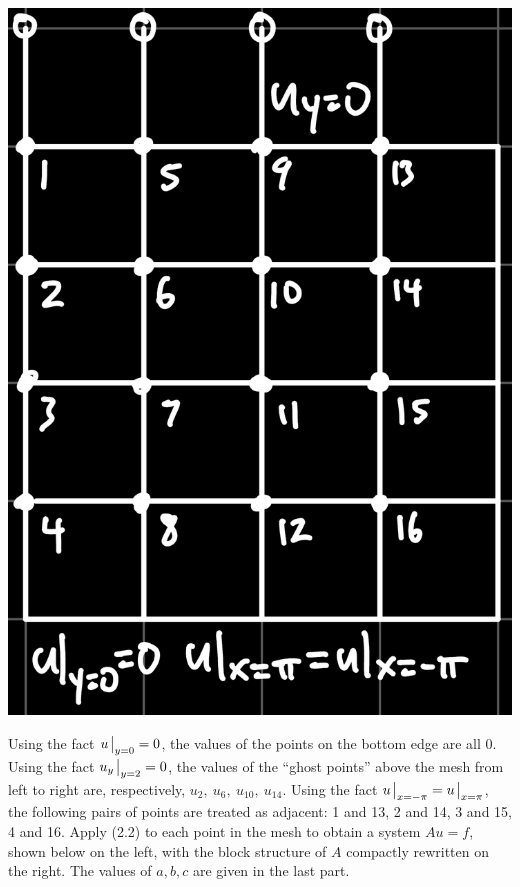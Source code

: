 \documentclass{article}
\begin{document}
\begin{enumerate}
\begin{enumerate}
	\begin{center}
		\includegraphics[scale=.1]{hw6 2 grid}
	\end{center}
	
	Using the fact $u\eval_{y=0}=0$, the values of the points on the bottom edge are all 0. Using the fact $u_y\eval_{y=2}=0$, the values of the ``ghost points'' above the mesh from left to right are, respectively, $u_2,~u_6,~u_{10},~u_{14}$. Using the fact $u\eval_{x=-\pi}=u\eval_{x=\pi}$, the following pairs of points are treated as adjacent: 1 and 13, 2 and 14, 3 and 15, 4 and 16. Apply (2.2) to each point in the mesh to obtain a system $Au=f$, shown below on the left, with the block structure of $A$ compactly rewritten on the right. The values of $a,b,c$ are given in the last part.
	

\end{enumerate}
\end{enumerate}
\end{document}
